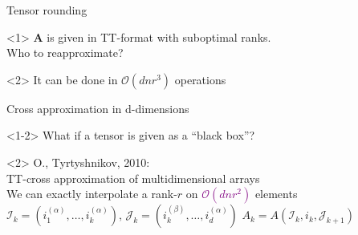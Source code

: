 \documentclass{beamer}[14pt, presentation]
\begin{document}
\begin{frame}[label=sec-5-5]{Tensor rounding}
\begin{onlyenv}<1>
$\mathbf{A}$ is given in  TT-format with suboptimal ranks. \\
  Who to reapproximate? \\
\end{onlyenv}

\begin{onlyenv}<2>
It can be done in $\mathcal{O}(dnr^3)$ operations 
\vskip 2mm
\end{onlyenv}
\end{frame}

\begin{frame}[label=sec-5-6]{Cross approximation in d-dimensions}
\begin{onlyenv}<1-2>
What if a tensor is given as a ``black box''?
\vskip 2mm
\end{onlyenv}

\begin{onlyenv}<2>
O., Tyrtyshnikov, 2010: \\
TT-cross approximation of multidimensional arrays\\
We can exactly interpolate a rank-$r$ on
\textcolor{purple}{$\mathcal{O}(dnr^2)$} elements \vskip 2mm
$\mathcal{I}_k = (i^{(\alpha)}_1,\ldots,i^{(\alpha)}_k)$, \vskip 2mm
$\mathcal{J}_k = (i^{(\beta)}_k, \ldots,i^{(\alpha)}_d)$
\vskip 2mm
$A_k = A(\mathcal{I}_k,i_k,\mathcal{J}_{k+1})$
\end{onlyenv}
\end{frame}
\end{document}
